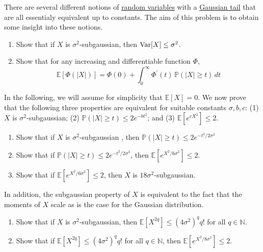   \begin{exercise}
  There are several different notions of \hyperref[prob-def:random-variable]{random variables} with a \hyperref[prob-thm:gaussian-tail-inequality]{Gaussian tail} that are all essentialy equivalent up to constants. The aim of this problem is to obtain some insight into these notions. 
  \begin{enumerate}
      \item Show that if $X$ is $\sigma^2$-subgaussian, then $\operatorname{Var}[X] \leq \sigma^2$. 
      \item Show that for any increasing and differentiable function $\Phi$, 
      \begin{equation}
        \mathbb{E}[ \Phi(|X|)] = \Phi(0) + \int_0^\infty \Phi^\prime (t) \, \mathbb{P}(|X| \geq t) \, dt
      \end{equation}
  \end{enumerate}
  In the following, we will assume for simplicity that $\mathbb{E}[X] = 0$. We now prove that the following three properties are equivalent for suitable constants $\sigma, b, c$: (1) $X$ is $\sigma^2$-subgaussian; (2) $\mathbb{P}(|X| \geq t) \leq 2 e^{-b t^2}$; and (3) $\mathbb{E}[e^{c X^2}] \leq 2$. 
  \begin{enumerate}[resume]
      \item Show that if $X$ is $\sigma^2$-subgaussian , then $\mathbb{P}(|X| \geq t) \leq 2 e^{-t^2 / 2 \sigma^2}$ 
      \item Show that if $\mathbb{P}(|X| \geq t) \leq 2 e^{- t^2 / 2 \sigma^2}$, then $\mathbb{E}[e^{X^2 / 6 \sigma^2} ] \leq 2$. 
      \item Show that if $\mathbb{E}[e^{X^2 / 6 \sigma^2}] \leq 2$, then $X$ is $18 \sigma^2$-subgaussian. 
  \end{enumerate}
  In addition, the subgaussian property of $X$ is equivalent to the fact that the moments of $X$ scale as is the case for the Gaussian distribution. 
  \begin{enumerate}[resume]
      \item Show that if $X$ is $\sigma^2$-subgaussian, then $\mathbb{E}[X^{2q}] \leq (4 \sigma^2)^q q!$ for all $q \in \mathbb{N}$. 
      \item Show that if $\mathbb{E}[X^{2q}] \leq (4 \sigma^2)^q q!$ for all $q \in \mathbb{N}$, then $\mathbb{E}[e^{X^2 / 8 \sigma^2}] \leq 2$. 
  \end{enumerate}
  \end{exercise}

